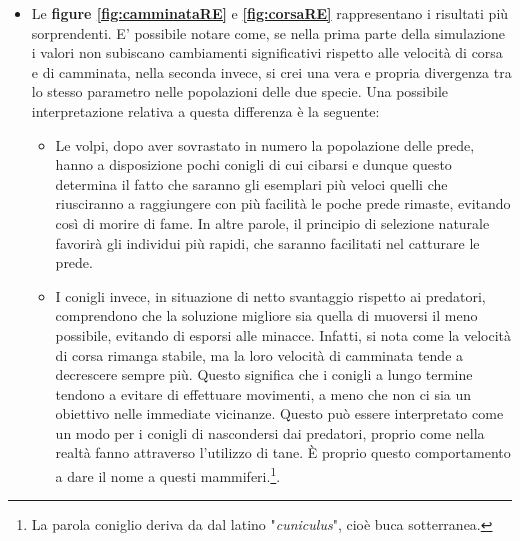 \documentclass[11pt]{article}
\begin{document}
\begin{itemize}


    \item Le \textbf{figure \ref{fig:camminataRE}} e \textbf{\ref{fig:corsaRE}} rappresentano i risultati più sorprendenti. E' possibile notare come, se nella prima parte della simulazione i valori non subiscano cambiamenti significativi rispetto alle velocità di corsa e di camminata, nella seconda invece, si crei una vera e propria divergenza tra lo stesso parametro nelle popolazioni delle due specie. Una possibile interpretazione relativa a questa differenza è la seguente:
    \begin{itemize}
        \item Le volpi, dopo aver sovrastato in numero la popolazione delle prede, hanno a disposizione pochi conigli di cui cibarsi e dunque questo determina il fatto che saranno gli esemplari più veloci quelli che riusciranno a raggiungere con più facilità le poche prede rimaste, evitando così di morire di fame. In altre parole, il principio di selezione naturale favorirà gli individui più rapidi, che saranno facilitati nel catturare le prede. 
        \item I conigli invece, in situazione di netto svantaggio rispetto ai predatori, comprendono che la soluzione migliore sia quella di muoversi il meno possibile, evitando di esporsi alle minacce. Infatti, si nota come la velocità di corsa rimanga stabile, ma la loro velocità di camminata tende a decrescere sempre più. Questo significa che i conigli a lungo termine tendono a evitare di effettuare movimenti, a meno che non ci sia un obiettivo nelle immediate vicinanze. Questo può essere interpretato come un modo per i conigli di nascondersi dai predatori, proprio come nella realtà fanno attraverso l'utilizzo di tane. È proprio questo comportamento a dare il nome a questi mammiferi.\footnote{La parola coniglio deriva da dal latino "\textit{cuniculus}", cioè buca sotterranea.\cite{WikiConiglio} }. 
    \end{itemize}

\end{itemize}

\newpage
\end{document}
